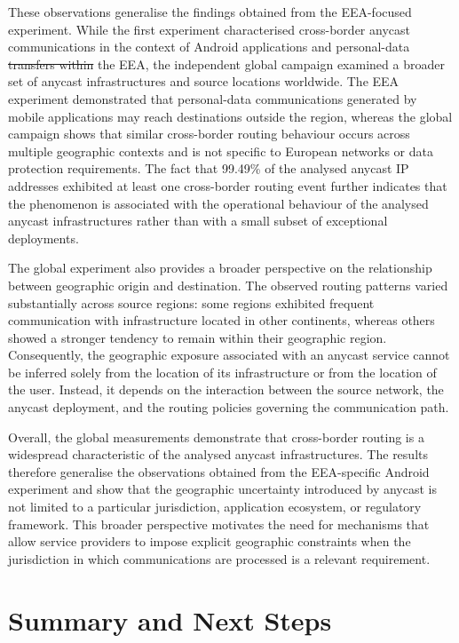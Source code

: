 \documentclass[
A4paper,                %
twoside,                %
openright,              %
chapterprefix=true,     %
12pt,                   %
headings=normal,        %
titlepage=on            %
]{book}
\makeatletter
\providecommand{\DIFaddtex}[1]{{\protect\color{blue}\uwave{#1}}} %
\providecommand{\DIFdeltex}[1]{{\protect\color{red}\sout{#1}}} %
\providecommand{\DIFaddbegin}{} %
\providecommand{\DIFaddend}{} %
\providecommand{\DIFdelbegin}{} %
\providecommand{\DIFdelend}{} %
\providecommand{\DIFadd}[1]{\texorpdfstring{\DIFaddtex{#1}}{#1}} %
\providecommand{\DIFdel}[1]{\texorpdfstring{\DIFdeltex{#1}}{}} %
\providecommand{\DIFscaledelfig}{0.5}
\newlength{\DIFdelgraphicswidth} %
\newlength{\DIFdelgraphicsheight} %
\providecommand{\DIFaddincludegraphics}[2][]{{\color{blue}\fbox{\DIFOincludegraphics[#1]{#2}}}} %
\providecommand{\DIFdelincludegraphics}[2][]{%
\sbox{\DIFdelgraphicsbox}{\DIFOincludegraphics[#1]{#2}}%
\settoboxwidth{\DIFdelgraphicswidth}{\DIFdelgraphicsbox} %
\settoboxtotalheight{\DIFdelgraphicsheight}{\DIFdelgraphicsbox} %
\scalebox{\DIFscaledelfig}{%
\parbox[b]{\DIFdelgraphicswidth}{\usebox{\DIFdelgraphicsbox}\\[-\baselineskip] \rule{\DIFdelgraphicswidth}{0em}}\llap{\resizebox{\DIFdelgraphicswidth}{\DIFdelgraphicsheight}{%
\setlength{\unitlength}{\DIFdelgraphicswidth}%
\begin{picture}(1,1)%
\thicklines\linethickness{2pt} %
{\color[rgb]{1,0,0}\put(0,0){\framebox(1,1){}}}%
{\color[rgb]{1,0,0}\put(0,0){\line( 1,1){1}}}%
{\color[rgb]{1,0,0}\put(0,1){\line(1,-1){1}}}%
\end{picture}%
}\hspace*{3pt}}} %
} %
\DeclareRobustCommand{\DIFaddbegin}{\DIFOaddbegin \let\includegraphics\DIFaddincludegraphics} %
\DeclareRobustCommand{\DIFaddend}{\DIFOaddend \let\includegraphics\DIFOincludegraphics} %
\DeclareRobustCommand{\DIFdelbegin}{\DIFOdelbegin \let\includegraphics\DIFdelincludegraphics} %
\DeclareRobustCommand{\DIFdelend}{\DIFOaddend \let\includegraphics\DIFOincludegraphics} %
\let\sout@orig\sout %
\renewcommand{\sout}[1]{\ifmmode\text{\sout@orig{\ensuremath{#1}}}\else\sout@orig{#1}\fi} %
\makeatother
\begin{document}
These observations generalise the findings obtained from the EEA-focused experiment. While the first experiment characterised cross-border anycast communications in the context of Android applications and personal-data \DIFdelbegin \DIFdel{transfers within }\DIFdelend \DIFaddbegin \DIFadd{communications originating in }\DIFaddend the EEA, the independent global campaign examined a broader set of anycast infrastructures and source locations worldwide. The EEA experiment demonstrated that personal-data communications generated by mobile applications may reach destinations outside the region, whereas the global campaign shows that similar cross-border routing behaviour occurs across multiple geographic contexts and is not specific to European networks or data protection requirements. The fact that 99.49\% of the analysed anycast IP addresses exhibited at least one cross-border routing event further indicates that the phenomenon is associated with the operational behaviour of the analysed anycast infrastructures rather than with a small subset of exceptional deployments.

The global experiment also provides a broader perspective on the relationship between geographic origin and destination. The observed routing patterns varied substantially across source regions: some regions exhibited frequent communication with infrastructure located in other continents, whereas others showed a stronger tendency to remain within their geographic region. Consequently, the geographic exposure associated with an anycast service cannot be inferred solely from the location of its infrastructure or from the location of the user. Instead, it depends on the interaction between the source network, the anycast deployment, and the routing policies governing the communication path.

Overall, the global measurements demonstrate that cross-border routing is a widespread characteristic of the analysed anycast infrastructures. The results therefore generalise the observations obtained from the EEA-specific Android experiment and show that the geographic uncertainty introduced by anycast is not limited to a particular jurisdiction, application ecosystem, or regulatory framework. This broader perspective motivates the need for mechanisms that allow service providers to impose explicit geographic constraints when the jurisdiction in which communications are processed is a relevant requirement.

\section{Summary and Next Steps}
\label{sc:anycast_experiments_summary}
\end{document}

